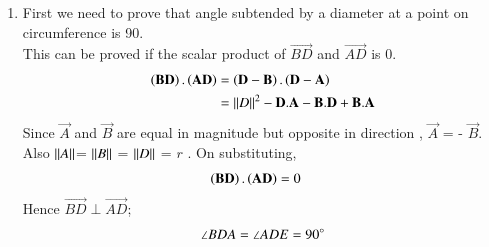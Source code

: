 \renewcommand{\theequation}{\theenumi}
\begin{enumerate}[label=\thesection.\arabic*.,ref=\thesection.\theenumi]

\item First we need to prove that angle subtended by a diameter at a point on circumference is 90\degree. \\
This can be proved if the scalar product of $\vec{BD}$ and $\vec{AD}$ is 0.
\begin{align}
\left(\mathbf{BD}\right).\left(\mathbf{AD}\right) &= \left(\mathbf{D}-\mathbf{B}\right).\left(\mathbf{D}-\mathbf{A}\right) \\
&= \left\lVert D\right\rVert^2 - \mathbf{D}.\mathbf{A} - \mathbf{B}.\mathbf{D} + \mathbf{B}.\mathbf{A}
\end{align}
Since $\vec{A}$ and $\vec{B}$ are equal in magnitude but opposite in direction , $\vec{A}$ = - $\vec{B}$. Also $\left\lVert A\right\rVert$= $\left\lVert B\right\rVert$ = $\left\lVert D\right\rVert$ = $r$ . On substituting,
\begin{align}
\left(\mathbf{BD}\right).\left(\mathbf{AD}\right) &= 0
\end{align}
Hence $\vec{BD} \perp \vec{AD}$; 
\begin{align}
\angle BDA = \angle ADE = 90\degree
\label{eq:angleADE}
\end{align}


\end{enumerate}
